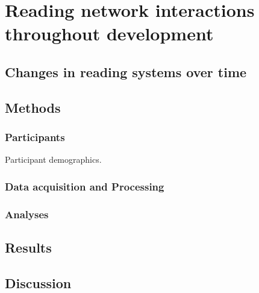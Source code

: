 \chapter{Reading network interactions throughout development}


\section{Changes in reading systems over time}

\section{Methods}

\subsection{Participants}

\begin{table}
\scriptsize
\renewcommand{\tabcolsep}{0.09cm}
\centering

\caption{Participant demographics.}
\label{table:Ch3_Participants}
\end{table}

\subsection{Data acquisition and Processing}

\subsection{Analyses}


\section{Results}


\section{Discussion}